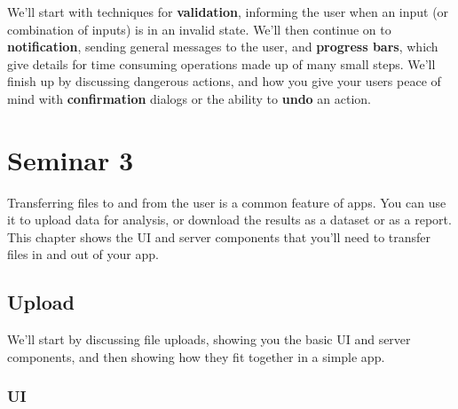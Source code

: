 \documentclass[
]{article}
\begin{document}
We'll start with techniques for \textbf{validation}, informing the user when an input (or combination of inputs) is in an invalid state.
We'll then continue on to \textbf{notification}, sending general messages to the user, and \textbf{progress bars}, which give details for time consuming operations made up of many small steps.
We'll finish up by discussing dangerous actions, and how you give your users peace of mind with \textbf{confirmation} dialogs or the ability to \textbf{undo} an action.

\hypertarget{seminar3}{%
\section{Seminar 3}\label{seminar3}}

Transferring files to and from the user is a common feature of apps.
You can use it to upload data for analysis, or download the results as a dataset or as a report.
This chapter shows the UI and server components that you'll need to transfer files in and out of your app.

\hypertarget{upload}{%
\subsection{Upload}\label{upload}}

We'll start by discussing file uploads, showing you the basic UI and server components, and then showing how they fit together in a simple app.

\hypertarget{ui}{%
\subsubsection{UI}\label{ui}}

  
\end{document}
